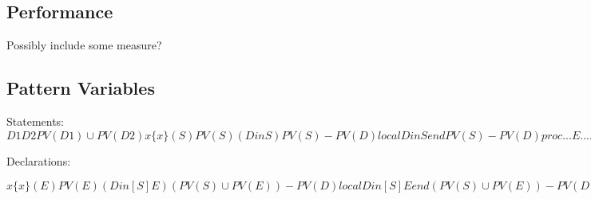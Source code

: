\documentclass[a4paper]{memoir}
\begin{document}
\section{Performance}
Possibly include some measure?





\begin{appendices} 

  \chapter{Pattern Variables}\label{appendix:patternvariables}
Statements:
$
D1 D2                        PV(D1) \cup PV(D2)
x                            \{x\}
(S)                          PV(S)
(D in S)                     PV(S) - PV(D)
local D in S end             PV(S) - PV(D)
proc ... {E ...} ... end     PV(E)
fun ... {E ...} ... end      PV(E)
class E ... end              PV(E)
functor E ... end            PV(E)
E = ...                      PV(E)
otherwise                    \emptyset
$


Declarations:

$
x                                         \{x\}
(E)                                       PV(E)
(D in [ S ] E)                            (PV(S) \cup PV(E)) - PV(D)
local D in [ S ] E end                    (PV(S) \cup PV(E)) - PV(D)
E1 = E2                                   PV(E1) \cup PV(E2)
[E1 ... En]                               PV(E1) \cup ... \cup PV(En)
E1|E2                                     PV(E1) \cup PV(E2)
E1\#...\#En                                 PV(E1) \cup ... \cup PV(En)
il([ f1: ] E1 ... [ fn: ] En [ ... ])     PV(E1) \cup ... \cup PV(En)
otherwise                                 \emptyset
$


\end{appendices}
\end{document}
